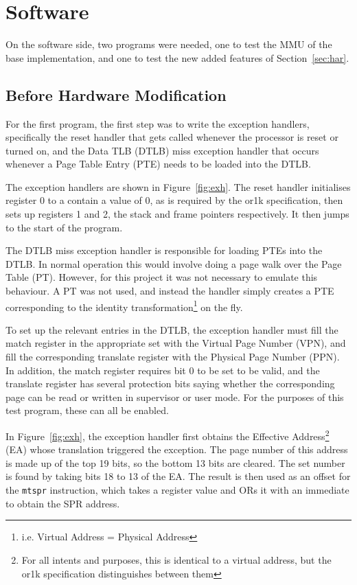 \section{Software}
On the software side, two programs were needed, one to test the MMU of the base implementation, and one to test the new added features of Section~\ref{sec:har}.

\subsection{Before Hardware Modification}
For the first program, the first step was to write the exception handlers, specifically the reset handler that gets called whenever the processor is reset or turned on, and the Data TLB (DTLB) miss exception handler that occurs whenever a Page Table Entry (PTE) needs to be loaded into the DTLB.

The exception handlers are shown in Figure~\ref{fig:exh}. The reset handler initialises register 0 to a contain a value of 0, as is required by the or1k specification, then sets up registers 1 and 2, the stack and frame pointers respectively. It then jumps to the start of the program.

The DTLB miss exception handler is responsible for loading PTEs into the DTLB. In normal operation this would involve doing a page walk over the Page Table (PT). However, for this project it was not necessary to emulate this behaviour. A PT was not used, and instead the handler simply creates a PTE corresponding to the identity transformation\footnote{i.e. Virtual Address = Physical Address} on the fly.

To set up the relevant entries in the DTLB, the exception handler must fill the match register in the appropriate set with the Virtual Page Number (VPN), and fill the corresponding translate register with the Physical Page Number (PPN). In addition, the match register requires bit 0 to be set to be valid, and the translate register has several protection bits saying whether the corresponding page can be read or written in supervisor or user mode. For the purposes of this test program, these can all be enabled.

In Figure~\ref{fig:exh}, the exception handler first obtains the Effective Address\footnote{For all intents and purposes, this is identical to a virtual address, but the or1k specification distinguishes between them} (EA) whose translation triggered the exception. The page number of this address is made up of the top 19 bits, so the bottom 13 bits are cleared. The set number is found by taking bits 18 to 13 of the EA. The result is then used as an offset for the \texttt{mtspr} instruction, which takes a register value and ORs it with an immediate to obtain the SPR address.

